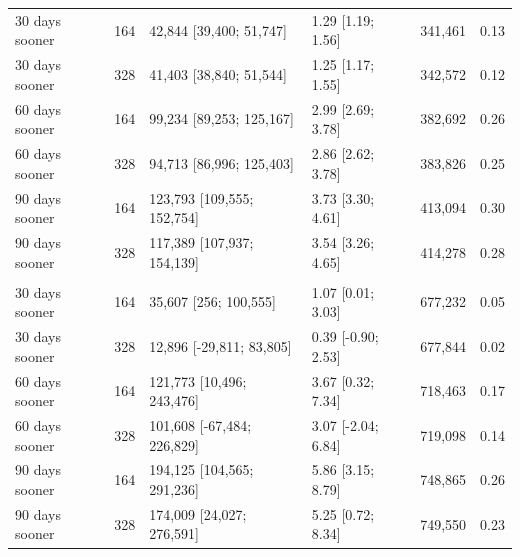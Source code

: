 \documentclass{article}
\begin{document}
\begin{table}
\begin{tabular}[t]{lrlllr}
\hspace{1em}30 days sooner & 164 & 42,844 [39,400; 51,747] & 1.29 [1.19; 1.56] & 341,461 & 0.13\\
\hspace{1em}30 days sooner & 328 & 41,403 [38,840; 51,544] & 1.25 [1.17; 1.55] & 342,572 & 0.12\\
\hspace{1em}60 days sooner & 164 & 99,234 [89,253; 125,167] & 2.99 [2.69; 3.78] & 382,692 & 0.26\\
\hspace{1em}60 days sooner & 328 & 94,713 [86,996; 125,403] & 2.86 [2.62; 3.78] & 383,826 & 0.25\\
\hspace{1em}90 days sooner & 164 & 123,793 [109,555; 152,754] & 3.73 [3.30; 4.61] & 413,094 & 0.30\\
\hspace{1em}90 days sooner & 328 & 117,389 [107,937; 154,139] & 3.54 [3.26; 4.65] & 414,278 & 0.28\\
\addlinespace[0.3em]
\multicolumn{6}{l}{\textbf{US to Jan 2022}}\\
\hspace{1em}30 days sooner & 164 & 35,607 [256; 100,555] & 1.07 [0.01; 3.03] & 677,232 & 0.05\\
\hspace{1em}30 days sooner & 328 & 12,896 [-29,811; 83,805] & 0.39 [-0.90; 2.53] & 677,844 & 0.02\\
\hspace{1em}60 days sooner & 164 & 121,773 [10,496; 243,476] & 3.67 [0.32; 7.34] & 718,463 & 0.17\\
\hspace{1em}60 days sooner & 328 & 101,608 [-67,484; 226,829] & 3.07 [-2.04; 6.84] & 719,098 & 0.14\\
\hspace{1em}90 days sooner & 164 & 194,125 [104,565; 291,236] & 5.86 [3.15; 8.79] & 748,865 & 0.26\\
\hspace{1em}90 days sooner & 328 & 174,009 [24,027; 276,591] & 5.25 [0.72; 8.34] & 749,550 & 0.23\\
\bottomrule
\end{tabular}
\end{table}
\end{document}
